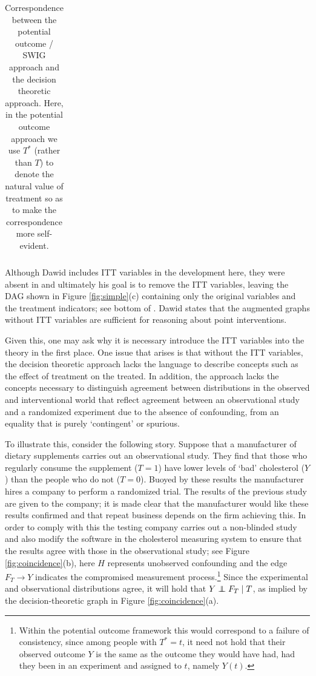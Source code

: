 \documentclass[11pt]{article}
\newcommand\indep{\protect\mathpalette{\protect\independenT}{\perp}}
\def\independenT#1#2{\mathrel{\rlap{$#1#2$}\mkern2.5mu{#1#2}}}
\begin{document}
{{\begin{table}
\begin{tabular}{lcc}
\end{tabular}
\caption{Correspondence between the potential outcome / SWIG approach and the decision theoretic approach.
Here, in the potential outcome approach we use $T^*$ (rather than $T$) to denote the natural value of treatment so as to make the correspondence more self-evident.
\label{tab:swig-decision}
}

\end{table}
}



Although Dawid includes ITT variables in the development here, they were absent in \citep{dawid:2000} and 
ultimately his goal is to remove the ITT variables, leaving the DAG shown in Figure \ref{fig:simple}(c) containing only the original variables and the 
treatment indicators; see bottom of \citep[p.65]{dawid:2021}. Dawid states that the augmented graphs without ITT variables are sufficient for reasoning about point interventions.

Given this, one may ask why it is necessary introduce the ITT variables into the theory in the first place.
One issue that arises is that without the ITT variables, the decision theoretic approach lacks the language to describe concepts such as the 
effect of treatment on the treated.  In addition, the approach lacks the concepts necessary to distinguish agreement between distributions in the observed and interventional world that reflect agreement between an observational study and a randomized experiment due to the absence of confounding, from an equality that is purely `contingent' or spurious. 

To illustrate this, consider the following story. Suppose that a manufacturer of dietary supplements carries out an observational study. They find that those who regularly consume the supplement ($T=1$) have lower levels of `bad' cholesterol ($Y$) than the people who do not ($T=0$). Buoyed by these results the manufacturer hires a company to perform a randomized trial. The results of the previous study are given to the company; it is made clear that the manufacturer would like these results confirmed and that repeat business depends on the firm achieving this.
In order to comply with this the testing company carries out a non-blinded study and also modify the software in the cholesterol measuring system to ensure that the results agree with those in the observational study; see Figure \ref{fig:coincidence}(b), here $H$ represents unobserved confounding and the edge $F_T \rightarrow Y$ indicates the compromised measurement process.\footnote{Within the potential outcome framework this would correspond to a failure of consistency, since among people with $T^*=t$, it need not hold that their observed outcome $Y$ is the same as the outcome they would have had, had they been in an experiment and assigned to $t$, namely $Y(t)$.} Since the experimental and observational distributions agree, it will hold that $Y \indep F_T \mid T$, as implied by the decision-theoretic graph in Figure  \ref{fig:coincidence}(a).

}
\end{document}
